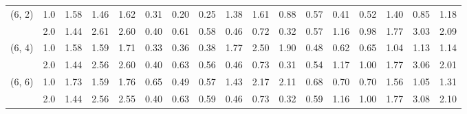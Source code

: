 \begin{tabular}{llrrrrrrrrrrrrrrr}
(6, 2) & 1.0 &   1.58 & 1.46 & 1.62 &    0.31 & 0.20 & 0.25 &    1.38 & 1.61 & 0.88 & 0.57 & 0.41 & 0.52 & 1.40 & 0.85 & 1.18 \\
       & 2.0 &   1.44 & 2.61 & 2.60 &    0.40 & 0.61 & 0.58 &    0.46 & 0.72 & 0.32 & 0.57 & 1.16 & 0.98 & 1.77 & 3.03 & 2.09 \\
(6, 4) & 1.0 &   1.58 & 1.59 & 1.71 &    0.33 & 0.36 & 0.38 &    1.77 & 2.50 & 1.90 & 0.48 & 0.62 & 0.65 & 1.04 & 1.13 & 1.14 \\
       & 2.0 &   1.44 & 2.56 & 2.60 &    0.40 & 0.63 & 0.56 &    0.46 & 0.73 & 0.31 & 0.54 & 1.17 & 1.00 & 1.77 & 3.06 & 2.01 \\
(6, 6) & 1.0 &   1.73 & 1.59 & 1.76 &    0.65 & 0.49 & 0.57 &    1.43 & 2.17 & 2.11 & 0.68 & 0.70 & 0.70 & 1.56 & 1.05 & 1.31 \\
       & 2.0 &   1.44 & 2.56 & 2.55 &    0.40 & 0.63 & 0.59 &    0.46 & 0.73 & 0.32 & 0.59 & 1.16 & 1.00 & 1.77 & 3.08 & 2.10 \\
\bottomrule
\end{tabular}
